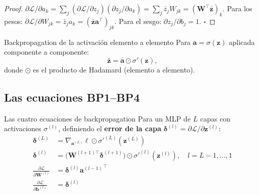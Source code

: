 \begin{proof}
$\partial\mathcal{L}/\partial a_k = \sum_j
(\partial\mathcal{L}/\partial z_j)(\partial z_j/\partial a_k) =
\sum_j \bar{z}_j W_{jk} = (\bm{W}^\top\bar{\bm{z}})_k$. Para los
pesos: $\partial\mathcal{L}/\partial W_{jk} = \bar{z}_j a_k =
(\bar{\bm{z}}\bm{a}^\top)_{jk}$. Para el sesgo:
$\partial z_j/\partial b_j = 1$. $\square$
\end{proof}

\begin{proposicion}{Backpropagation de la activación elemento a elemento}
\label{prop:bp_sigma}
Para $\bm{a} = \sigma(\bm{z})$ aplicada componente a componente:
\begin{equation}
  \bar{\bm{z}} = \bar{\bm{a}} \odot \sigma'(\bm{z}),
  \label{eq:bp_sigma}
\end{equation}
donde $\odot$ es el producto de Hadamard (elemento a elemento).
\end{proposicion}

\subsection{Las ecuaciones BP1–BP4}
\label{subsec:bp1234}

\begin{teorema}{Las cuatro ecuaciones de backpropagation}
\label{thm:cuatro_ec}
Para un MLP de $L$ capas con activaciones $\sigma^{(l)}$, definiendo el
\textbf{error de la capa} $\bm{\delta}^{(l)} =
\partial\mathcal{L}/\partial\bm{z}^{(l)}$:
\begin{align}
  \bm{\delta}^{(L)} &= \nabla_{\bm{a}^{(L)}}\ell
  \odot \sigma'^{(L)}(\bm{z}^{(L)})
  \tag{BP1}\label{eq:bp1}\\
  \bm{\delta}^{(l)} &= \bigl(\bm{W}^{(l+1)\top}
  \bm{\delta}^{(l+1)}\bigr) \odot \sigma'^{(l)}(\bm{z}^{(l)}),
  \quad l = L{-}1,\ldots,1
  \tag{BP2}\label{eq:bp2}\\
  \frac{\partial\mathcal{L}}{\partial\bm{W}^{(l)}}
  &= \bm{\delta}^{(l)}{\bm{a}^{(l-1)}}^\top
  \tag{BP3}\label{eq:bp3}\\
  \frac{\partial\mathcal{L}}{\partial\bm{b}^{(l)}}
  &= \bm{\delta}^{(l)}
  \tag{BP4}\label{eq:bp4}
\end{align}
\end{teorema}

